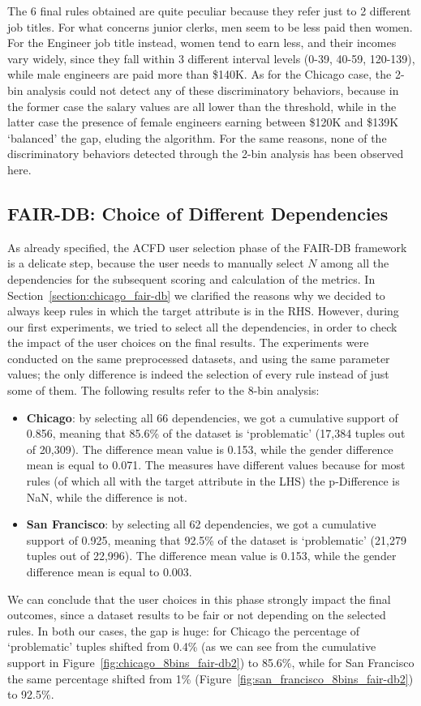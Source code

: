 \begin{itemize}
The 6 final rules obtained are quite peculiar because they refer just to 2 different job titles. For what concerns junior clerks, men seem to be less paid then women. For the Engineer job title instead, women tend to earn less, and their incomes vary widely, since they fall within 3 different interval levels (0-39, 40-59, 120-139), while male engineers are paid more than \$140K. As for the Chicago case, the 2-bin analysis could not detect any of these discriminatory behaviors, because in the former case the salary values are all lower than the threshold, while in the latter case the presence of female engineers earning between \$120K and \$139K `balanced' the gap, eluding the algorithm. For the same reasons, none of the discriminatory behaviors detected through the 2-bin analysis has been observed here.
\end{itemize} 


\subsection{FAIR-DB: Choice of Different Dependencies}
\label{section:fair-db_choice_different_dependencies}
As already specified, the ACFD user selection phase of the FAIR-DB framework is a delicate step, because the user needs to manually select \(N\) among all the dependencies for the subsequent scoring and calculation of the metrics. In Section~\ref{section:chicago_fair-db} we clarified the reasons why we decided to always keep rules in which the target attribute is in the RHS. However, during our first experiments, we tried to select all the dependencies, in order to check the impact of the user choices on the final results. The experiments were conducted on the same preprocessed datasets, and using the same parameter values; the only difference is indeed the selection of every rule instead of just some of them. The following results refer to the 8-bin analysis:
\begin{itemize}
\item \textbf{Chicago}: by selecting all 66 dependencies, we got a cumulative support of 0.856, meaning that 85.6\% of the dataset is `problematic' (17,384 tuples out of 20,309). The difference mean value is 0.153, while the gender difference mean is equal to 0.071. The measures have different values because for most rules (of which all with the target attribute in the LHS) the p-Difference is NaN, while the difference is not.
\item \textbf{San Francisco}: by selecting all 62 dependencies, we got a cumulative support of 0.925, meaning that 92.5\% of the dataset is `problematic' (21,279 tuples out of 22,996). The difference mean value is 0.153, while the gender difference mean is equal to 0.003.
\end{itemize}
We can conclude that the user choices in this phase strongly impact the final outcomes, since a dataset results to be fair or not depending on the selected rules. In both our cases, the gap is huge: for Chicago the percentage of `problematic' tuples shifted from 0.4\% (as we can see from the cumulative support in Figure~\ref{fig:chicago_8bins_fair-db2}) to 85.6\%, while for San Francisco the same percentage shifted from 1\% (Figure~\ref{fig:san_francisco_8bins_fair-db2}) to 92.5\%.


